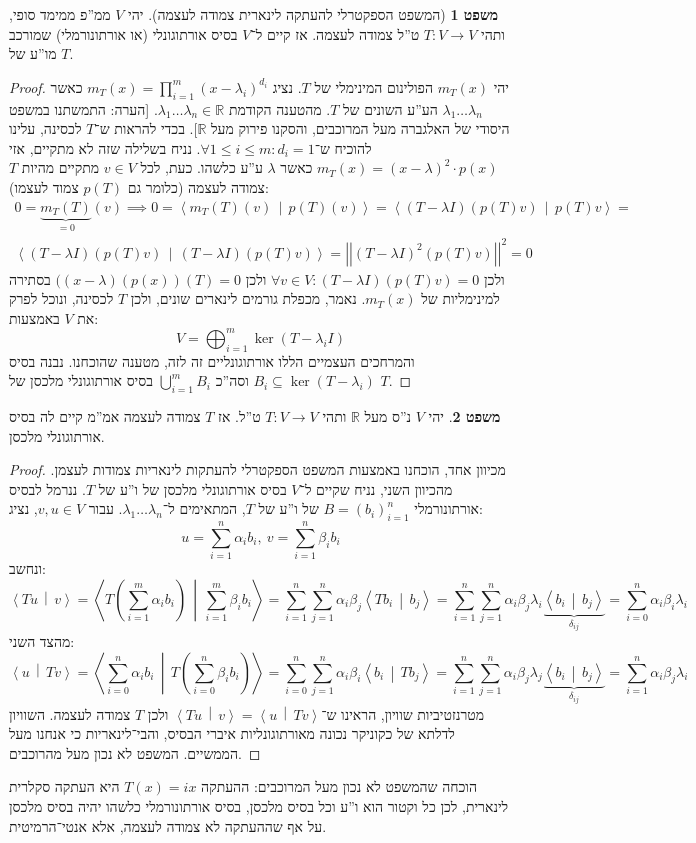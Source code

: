 \documentclass[a4paper]{article}
\newcommand\R     {\mathbb{R}}
\newcommand\ra    {\rangle}
\newcommand\la    {\langle}
\newcommand\sumni     {\sum_{i = 0}^{n}}
\newcommand\co        {\colon}
\newcommand\norm[1]   {\left \vert \left \vert #1 \right \vert \right \vert}
\newcommand\mut [2]   {\left \la #1 \,\middle|\, #2 \right \ra}
\newcommand\ag        {\alpha}
\newcommand\bg        {\beta}
\newcommand\dg        {\delta}
\renewcommand\lg      {\lambda}
\newcommand\cl [1]    {\left ( #1 \right )}
\theoremstyle{definition}
\newtheorem{Theorem}{\color{myblue}משפט}
\newcommand\theo  [1] {\begin{Theorem}#1\end{Theorem}}
\begin{document}
	\begin{Theorem}[המשפט הספקטרלי להעתקה לינארית צמודה לעצמה]
		יהי $V$ ממ''פ ממימד סופי, ותהי $T \co V \to V$ ט''ל צמודה לעצמה. אז קיים ל־$V$ בסיס אורתוגונלי (או אורתונורמלי) שמורכב מו''ע של $T$. 
	\end{Theorem} \begin{proof}
		יהי $m_T(x)$ הפולינום המינימלי של $T$. נציג $m_T(x) = \prod_{i = 1}^{m}(x - \lg_i)^{d_i}$ כאשר $\lg_1 \dots \lg_n$ הע''ע השונים של $T$. מהטענה הקודמת $\lg_1 \dots \lg_n \in \R$. [הערה: התמשתנו במשפט היסודי של האלגברה מעל המרוכבים, והסקנו פירוק מעל $\R$]. בכדי להראות ש־$T$ לכסינה, עלינו להוכיח ש־$\forall 1 \le i \le m \co d_i = 1$. נניח בשלילה שזה לא מתקיים, אזי $m_T(x) = (x - \lg)^2 \cdot p(x)$ כאשר $\lg$ ע''ע כלשהו. כעת, לכל $v \in V$ מתקיים מהיות $T$ צמודה לעצמה (כלומר גם $p(T)$ צמוד לעצמו): 
		\begin{multline*}
			0 = \underbrace{m_T(T)}_{=0}(v) \implies 0 = \mut{m_T(T)(v)}{p(T)(v)} = \mut{(T - \lg I)(p(T)v)}{p(T)v} =\\ \mut{(T - \lg I)(p(T)v)}{(T - \lg I)(p(T)v)} = \norm{(T - \lg I)^2(p(T)v)}^2 = 0
		\end{multline*}
		ולכן $\forall v \in V \co (T - \lg I)(p(T)v) = 0$ ולכן $((x - \lg)(p(x))(T) = 0$ בסתירה למינימליות של $m_T(x)$. נאמר, מכפלת גורמים לינארים שונים, ולכן $T$ לכסינה, ונוכל לפרק את $V$ באמצעות: 
		\[ V = \bigoplus_{i = 1}^{m} \ker (T - \lg_i I) \]
		והמרחכים העצמיים הללו אורתוגונליים זה לזה, מטענה שהוכחנו. 
		נבנה בסיס $B_i \subseteq \ker (T - \lg_i)$ וסה''כ $\bigcup_{i = 1}^{m} B_i$ בסיס אורתוגונלי מלכסן של $T$. 
	\end{proof}
	\theo{יהי $V$ נ''ס מעל $\R$ ותהי $T \co V \to V$ ט''ל. אז $T$ צמודה לעצמה אמ''מ קיים לה בסיס אורתוגונלי מלכסן. }\begin{proof}
		מכיוון אחד, הוכחנו באמצעות המשפט הספקטרלי להעתקות לינאריות צמודות לעצמן. 
		מהכיוון השני, נניח שקיים ל־$V$ בסיס אורתוגונלי מלכסן של ו''ע של $T$. ננרמל לבסיס אורתונורמלי $B = (b_i)_{i = 1}^{n}$ של ו''ע של $T$, המתאימים ל־$\lg_1 \dots \lg_n$. עבור $v, u \in V$, נציג: 
		\[ u = \sum_{i = 1}^{n}\ag_i b_i, \ v = \sum_{i = 1}^{n}\bg_i b_i \]
		ונחשב: 
		\[ \mut{Tu}{v} = \mut{T\cl{\sum_{i = 1}^{m}\ag_i b_i}}{\sum_{i = 1}^{m}\bg_i b_i} = \sum_{i = 1}^{n}\sum_{j = 1}^{n}\ag_i \bg_j \mut{T b_i}{b_j} = \sum_{i = 1}^{n}\sum_{j = 1}^{n}\ag_i \bg_j \lg_i \underbrace{\mut{b_i}{b_j}}_{\dg_{ij}} = \sumni \ag_i \bg_i \lg_i \]
		מהצד השני: 
		\[ \mut{u}{Tv} = \mut{\sumni \ag_i b_i}{T\cl{\sumni \bg_i b_i}} = \sumni \sum_{j = 1}^{n}\ag_i \bg_i \mut{b_i}{Tb_j} = \sum_{i = 1}^{n}\sum_{j = 1}^{n}\ag_i \bg_j \lg_j \underbrace{\mut{b_i}{b_j}}_{\dg_{ij}} = \sum_{i = 1}^{n}\ag_i \bg_j \lg_i \]
		מטרנזטיביות שוויון, הראינו ש־$\mut{Tu}{v} = \mut{u}{Tv}$ ולכן $T$ צמודה לעצמה. השוויון לדלתא של כקוניקר נכונה מאורתוגונליות איברי הבסיס, והבי־לינאריות כי אנחנו מעל הממשיים. המשפט לא נכון מעל מהרוכבים. 
	\end{proof}
	הוכחה שהמשפט לא נכון מעל המרוכבים: ההעתקה $T(x) = ix$ היא העתקה סקלרית לינארית, לכן כל וקטור הוא ו''ע וכל בסיס מלכסן, בסיס אורתונורמלי כלשהו יהיה בסיס מלכסן על אף שההעתקה לא צמודה לעצמה, אלא אנטי־הרמיטית. 
	
\end{document}
